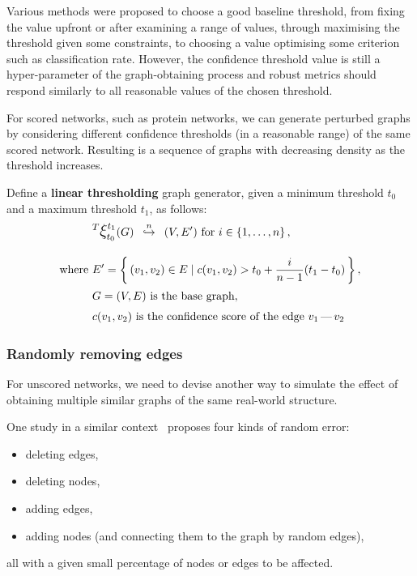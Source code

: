 Various methods were proposed to choose a good baseline threshold, from fixing the value upfront\cite{MeunierAgerelatedChangesModular2009} or after examining a range of values\cite{vanWijkComparingBrainNetworks2010,HorstmannStateDependentProperties2010}, through maximising the threshold given some constraints\cite{BassettAdaptiveReconfigurationFractal2006}, to choosing a value optimising some criterion such as classification rate\cite{ZaninOptimizingFunctionalNetwork2012}.
However, the confidence threshold value is still a hyper-parameter of the graph-obtaining process and robust metrics should respond similarly to all reasonable values of the chosen threshold.

For scored networks, such as protein networks, we can generate perturbed graphs by considering different confidence thresholds (in a reasonable range) of the same scored network.
Resulting is a sequence of graphs with decreasing density as the threshold increases.

Define a \textbf{linear thresholding} graph generator, given a minimum threshold $t_0$ and a maximum threshold $t_1$, as follows:
\begin{align}
    &\mathlarger{^T \mathlarger{\xi}}_{t_0}^{t_1}(G) \generates{n} (V, E')~\text{for}~i\in \integersto{n}, \\[10pt]
    \text{where}~&E' = \Set{(v_1, v_2)\in E}{ c(v_1, v_2) > t_0 + \frac{i}{n - 1}(t_1 - t_0) }, \nonumber \\
    &G = (V, E)~\text{is the base graph}, \nonumber \\
    &c(v_1, v_2)~\text{is the confidence score of the edge $v_1\,\text{---}\,v_2$} \nonumber
\end{align}


\subsubsection{Randomly removing edges}\label{sec:randomly_removing_edges}

For unscored networks, we need to devise another way to simulate the effect of obtaining multiple similar graphs of the same real-world structure.

One study in a similar context~\cite{BorgattiRobustnessCentralityMeasures2006} proposes four kinds of random error:
\begin{itemize}[topsep=5pt]
    \item deleting edges,
    \item deleting nodes,
    \item adding edges,
    \item adding nodes (and connecting them to the graph by random edges),
\end{itemize}
all with a given small percentage of nodes or edges to be affected.

